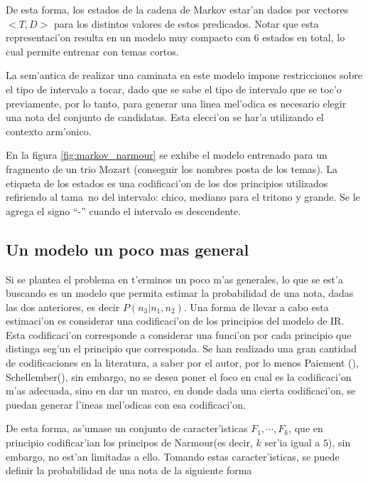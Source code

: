 De esta forma, los estados de la cadena de Markov estar'an dados por vectores $<T, D>$ para los distintos valores de estos predicados. Notar que esta representaci'on
resulta en un modelo muy compacto con $6$ estados en total, lo cual permite entrenar con temas cortos.

La sem'antica de realizar una caminata en este modelo impone restricciones sobre el tipo de intervalo a tocar, dado que se sabe el tipo de intervalo que se 
toc'o previamente, por lo tanto, para generar una linea mel'odica es necesario elegir una nota del conjunto de candidatas. Esta elecci'on se har'a utilizando el contexto
arm'onico.

En la figura \ref{fig:markov_narmour} se exhibe el modelo entrenado para un fragmento de un trio Mozart (\alert{conseguir los nombres posta de los temas}). 
La etiqueta de los estados es una codificaci'on de los dos principios utilizados refiriendo al tama~no del intervalo: chico, mediano para el tritono y grande. Se 
le agrega el signo ``-'' cuando el intervalo es descendente.


\begin{imagen}
    \width{12cm}
\end{imagen}

\subsection{Un modelo un poco mas general}
Si se plantea el problema en t'erminos un poco m'as generales, lo que se est'a buscando es un modelo que permita estimar la probabilidad de una nota, 
dadas las dos anteriores, es decir $P(n_3|n_1, n_2)$. Una forma de llevar a cabo esta estimaci'on es considerar una codificaci'on de los principios del modelo de IR.
Esta codificaci'on corresponde a considerar una funci'on por cada principio que distinga seg'un el principio que corresponda. Se han realizado una gran cantidad
de codificaciones en la literatura, a saber por el autor, por lo menos Paiement (\cita), Schellember(\cita), sin embargo, no se desea poner el foco en cual es 
la codificaci'on m'as adecuada, sino en dar un marco, en donde dada una cierta codificaci'on, se puedan generar l'ineas mel'odicas con esa codificaci'on.

De esta forma, as'umase un conjunto de caracter'isticas $F_1, \cdots, F_k$, que en principio codificar'ian los principos de Narmour(es decir, $k$ ser'ia igual a $5$), 
sin embargo, no est'an limitadas a ello. Tomando estas caracter'isticas, se puede definir la probabilidad de una nota de la siguiente forma

